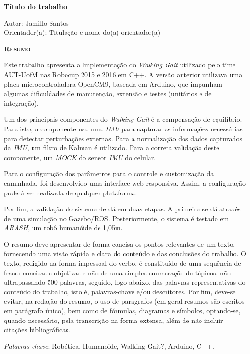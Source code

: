\begin{center}
	{\Large{\textbf{Título do trabalho}}}
\end{center}

\vspace{1cm}

\begin{flushright}
	Autor: Jamillo Santos\\
	Orientador(a): Titulação e nome do(a) orientador(a)
\end{flushright}

\vspace{1cm}

\begin{center}
	\Large{\textsc{\textbf{Resumo}}}
\end{center}


\noindent Este trabalho apresenta a implementação do \textit{Walking Gait} utilizado pelo time AUT-UofM nas Robocup 2015 e 2016 em C++. A versão anterior utilizava uma placa microcontroladora OpenCM9, baseada em Arduino, que impunham algumas dificuldades de manutenção, extensão e testes (unitários e de integração).

Um dos principais componentes do \textit{Walking Gait} é a compensação de equilíbrio. Para isto, o componente usa uma \textit{IMU} para capturar as informações necessárias para detectar perturbações externas. Para a normalização dos dados capturados da \textit{IMU}, um filtro de Kalman é utilizado. Para a correta validação deste componente, um \textit{MOCK} do sensor \textit{IMU} do celular.

Para o configuração dos parâmetros para o controle e customização da caminhada, foi desenvolvido uma interface web responsiva. Assim, a configuração poderá ser realizada de qualquer plataforma.

Por fim, a validação do sistema de dá em duas etapas. A primeira se dá através de uma simulação no Gazebo/ROS. Posteriormente, o sistema é testado em \textit{ARASH}, um robô humanóide de 1,05m.

\noindent O resumo deve apresentar de forma concisa os pontos relevantes de um
texto, fornecendo uma visão rápida e clara do conteúdo e das conclusões do
trabalho. O texto, redigido na forma impessoal do verbo, é constituído de uma
sequência de frases concisas e objetivas e não de uma simples enumeração de
tópicos, não ultrapassando 500 palavras, seguido, logo abaixo, das palavras
representativas do conteúdo do trabalho, isto é, palavras-chave e/ou
descritores. Por fim, deve-se evitar, na redação do resumo, o uso de parágrafos
(em geral resumos são escritos em parágrafo único), bem como de fórmulas,
diagramas e símbolos, optando-se, quando necessário, pela transcrição na forma
extensa, além de não incluir citações bibliográficas.

\noindent\textit{Palavras-chave}: Robótica, Humanoide, Walking Gait?, Arduino, C++.